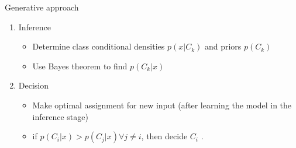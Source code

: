 \documentclass[serif, aspectratio=169]{beamer}
\begin{document}
\begin{frame}{Generative approach}
    \begin{enumerate}
        \item Inference
        \begin{itemize}
            \item Determine class conditional densities $p(x|C_k)$ and priors $p(C_k)$
            \item Use Bayes theorem to find $p(C_k|x)$
        \end{itemize}
        \item Decision
        \begin{itemize}
            \item Make optimal assignment for new input (after learning the model in the inference stage)
            \item if $p(C_i|x) > p(C_j|x) \forall j \neq i$, then decide $C_i$ .
        \end{itemize}
    \end{enumerate}
\end{frame}
\end{document}
